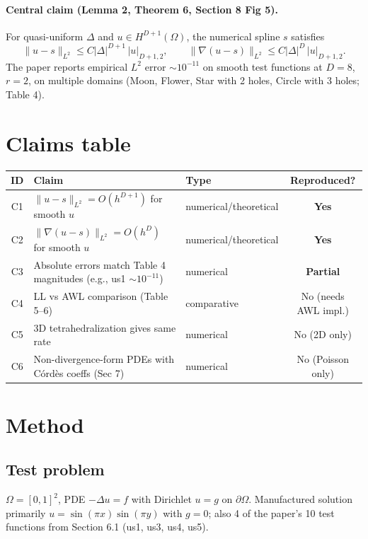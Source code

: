 \documentclass[11pt]{article}
\begin{document}
\paragraph{Central claim (Lemma 2, Theorem 6, Section 8 Fig 5).}
For quasi-uniform $\Delta$ and $u \in H^{D+1}(\Omega)$, the numerical spline $s$ satisfies
\begin{equation}
\|u-s\|_{L^2} \le C |\Delta|^{D+1} \, |u|_{D+1,2}, \qquad \|\nabla(u-s)\|_{L^2} \le C |\Delta|^{D} \, |u|_{D+1,2}.
\end{equation}
The paper reports empirical $L^2$ error $\sim 10^{-11}$ on smooth test functions at $D=8$, $r=2$, on multiple domains (Moon, Flower, Star with 2 holes, Circle with 3 holes; Table 4).

\section{Claims table}

\begin{center}
\begin{tabular}{cllc}
\toprule
ID & Claim & Type & Reproduced? \\
\midrule
C1 & $\|u-s\|_{L^2} = O(h^{D+1})$ for smooth $u$ & numerical/theoretical & \textbf{Yes} \\
C2 & $\|\nabla(u-s)\|_{L^2} = O(h^{D})$ for smooth $u$ & numerical/theoretical & \textbf{Yes} \\
C3 & Absolute errors match Table 4 magnitudes (e.g., us1 $\sim 10^{-11}$) & numerical & \textbf{Partial} \\
C4 & LL vs AWL comparison (Table 5--6) & comparative & No (needs AWL impl.) \\
C5 & 3D tetrahedralization gives same rate & numerical & No (2D only) \\
C6 & Non-divergence-form PDEs with C\'ord\`es coeffs (Sec 7) & numerical & No (Poisson only) \\
\bottomrule
\end{tabular}
\end{center}

\section{Method}

\subsection{Test problem}
$\Omega = [0,1]^2$, PDE $-\Delta u = f$ with Dirichlet $u = g$ on $\partial\Omega$. Manufactured solution primarily $u = \sin(\pi x)\sin(\pi y)$ with $g = 0$; also 4 of the paper's 10 test functions from Section 6.1 (us1, us3, us4, us5).
\end{document}
